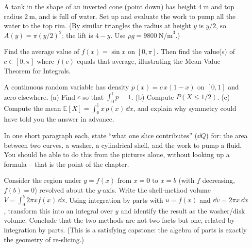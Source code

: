 \begin{exercise}
A tank in the shape of an inverted cone (point down) has height $4\ \text{m}$ and
top radius $2\ \text{m}$, and is full of water. Set up and evaluate the work to pump
all the water to the top rim. (By similar triangles the radius at height $y$ is
$y/2$, so $A(y) = \pi(y/2)^2$; the lift is $4-y$. Use $\rho g = 9800\
\text{N/m}^3$.)
\end{exercise}

\begin{exercise}
Find the average value of $f(x) = \sin x$ on $[0,\pi]$. Then find the value(s) of
$c\in[0,\pi]$ where $f(c)$ equals that average, illustrating the Mean Value Theorem
for Integrals.
\end{exercise}

\begin{exercise}
A continuous random variable has density $p(x) = c\,x(1-x)$ on $[0,1]$ and zero
elsewhere. (a) Find $c$ so that $\int_0^1 p = 1$. (b) Compute $P(X \le 1/2)$.
(c) Compute the mean $\mathbb{E}[X] = \int_0^1 x\,p(x)\,\dd x$, and explain why
symmetry could have told you the answer in advance.
\end{exercise}

\begin{exercise}
In one short paragraph each, state ``what one slice contributes'' ($\dd Q$) for:
the area between two curves, a washer, a cylindrical shell, and the work to pump a
fluid. You should be able to do this from the pictures alone, without looking up a
formula -- that is the point of the chapter.
\end{exercise}

\begin{exercise}
Consider the region under $y=f(x)$ from $x=0$ to $x=b$ (with $f$ decreasing,
$f(b)=0$) revolved about the $y$-axis. Write the shell-method volume
$V = \int_0^b 2\pi x f(x)\,\dd x$. Using integration by parts with $u=f(x)$ and
$\dd v = 2\pi x\,\dd x$, transform this into an integral over $y$ and identify the
result as the washer/disk volume. Conclude that the two methods are not two facts
but one, related by integration by parts. (This is a satisfying capstone: the
algebra of parts is exactly the geometry of re-slicing.)
\end{exercise}
